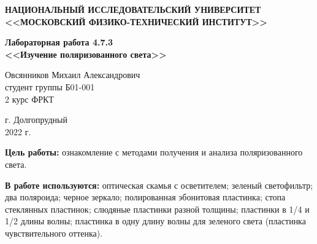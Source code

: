 \documentclass[a4paper,12pt]{article} %
\begin{document}
	
	
	\begin{center}
		
		
		\textbf{НАЦИОНАЛЬНЫЙ ИССЛЕДОВАТЕЛЬСКИЙ УНИВЕРСИТЕТ \\ <<МОСКОВСКИЙ ФИЗИКО-ТЕХНИЧЕСКИЙ ИНСТИТУТ>>}
		\vspace{13ex}
		
		\textbf{Лабораторная работа 4.7.3\\ <<Изучение поляризованного света>>}
		\vspace{40ex}
		
		\normalsize{Овсянников Михаил Александрович \\ студент группы Б01-001\\ 2 курс ФРКТ\\}
	\end{center}
	
	\vfill 
	
	\begin{center}
		г. Долгопрудный\\ 
		2022 г.
	\end{center}
	
	
	\thispagestyle{empty} %
	\newpage
	
	
	\textbf{Цель работы:} ознакомление с методами получения и анализа поляризованного света.
	
	\textbf{В работе используются:} оптическая скамья с осветителем; зеленый светофильтр; два поляроида; черное зеркало; полированная эбонитовая пластинка; стопа стеклянных пластинок; слюдяные пластинки разной толщины; пластинки в 1/4 и 1/2 длины волны; пластинка в одну длину волны для зеленого света (пластинка чувствительного оттенка).
	
	
\end{document}
